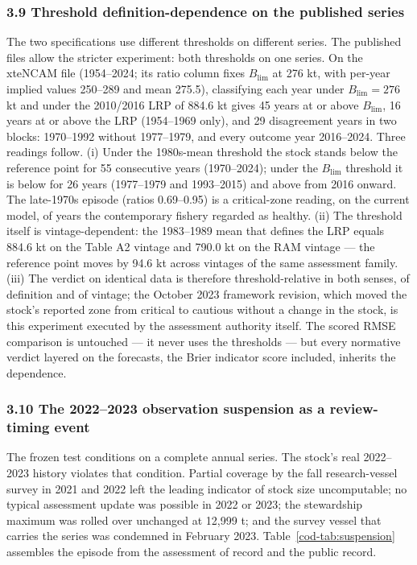 \documentclass[11pt]{article}
\begin{document}
\subsubsection{3.9 Threshold definition-dependence on the published series}\label{cod-definition-dependence}

The two specifications use different thresholds on different series. The
published files allow the stricter experiment: both thresholds on one
series. On the xteNCAM file (1954--2024; its ratio column fixes
\(B_{\mathrm{lim}}\) at 276 kt, with per-year implied values 250--289 and
mean 275.5), classifying each year under \(B_{\mathrm{lim}} = 276\) kt
and under the 2010/2016 LRP of 884.6 kt gives 45 years at or above
\(B_{\mathrm{lim}}\), 16 years at or above the LRP (1954--1969 only),
and 29 disagreement years in two blocks: 1970--1992 without
1977--1979, and every outcome year 2016--2024. Three readings follow.
(i) Under the 1980s-mean threshold the stock stands below the reference
point for 55 consecutive years (1970--2024); under the
\(B_{\mathrm{lim}}\) threshold it is below for 26 years (1977--1979 and
1993--2015) and above from 2016 onward. The late-1970s episode (ratios
0.69--0.95) is a critical-zone reading, on the current model, of years
the contemporary fishery regarded as healthy. (ii) The threshold itself
is vintage-dependent: the 1983--1989 mean that defines the LRP equals
884.6 kt on the Table A2 vintage and 790.0 kt on the RAM vintage --- the
reference point moves by 94.6 kt across vintages of the same assessment
family. (iii) The verdict on identical data is therefore
threshold-relative in both senses, of definition and of vintage; the
October 2023 framework revision, which moved the stock's reported zone
from critical to cautious without a change in the stock, is this
experiment executed by the assessment authority itself. The scored RMSE
comparison is untouched --- it never uses the thresholds --- but every
normative verdict layered on the forecasts, the Brier indicator score
included, inherits the dependence.

\subsubsection{3.10 The 2022--2023 observation suspension as a review-timing event}\label{cod-suspension}

The frozen test conditions on a complete annual series. The stock's real
2022--2023 history violates that condition. Partial coverage by the fall
research-vessel survey in 2021 and 2022 left the leading indicator of
stock size uncomputable; no typical assessment update was possible in
2022 or 2023; the stewardship maximum was rolled over unchanged at
12{,}999 t; and the survey vessel that carries the series was condemned
in February 2023. Table~\ref{cod-tab:suspension} assembles the episode from
the assessment of record and the public record.
\end{document}

